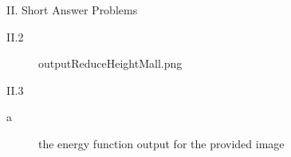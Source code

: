 \documentclass[a4paper,12pt]{article}
\begin{document}
\begin{section}{II. Short Answer Problems}
\begin{subsection}{II.2}
\begin{figure}[!htb]
        \caption{outputReduceHeightMall.png}
      \end{figure}
\end{subsection}

\clearpage

\begin{subsection}{II.3}



\begin{subsubsection}{a}
\begin{figure}[!htb]
        \caption{the energy function output for the provided image}
      \end{figure}
\end{subsubsection}


\end{subsection}
\end{section}
\end{document}

